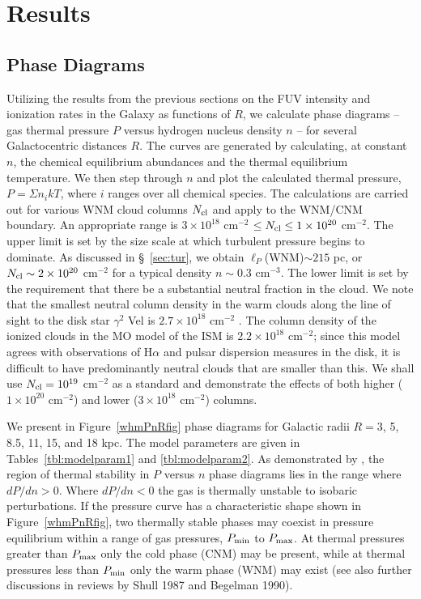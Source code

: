 \documentclass[12pt,preprint,flushrt]{aastex}
\newcommand{\ellp}{\ell_{P}}
\begin{document}
\section{Results}
\label{sec:Results}

\subsection{Phase Diagrams} \label{sub:PnR}

Utilizing the results from the previous sections on the FUV
intensity and ionization rates in the Galaxy as functions of $R$,
we calculate phase diagrams -- gas thermal
pressure
$P$ versus
hydrogen nucleus density $n$ -- for several Galactocentric distances $R$. The
curves are generated by calculating, at constant $n$, the chemical
equilibrium abundances and the thermal equilibrium temperature. We then step
through $n$
and plot the calculated thermal pressure, $P=\Sigma n_i kT$,
where $i$ ranges over all chemical species. The calculations are carried
out for various WNM cloud columns $N_{\rm cl}$ and apply to the WNM/CNM
boundary.
An appropriate range is $3\times 10^{18}$
cm$^{-2}$ $\le N_{\rm cl} \le 1\times 10^{20}$ cm$^{-2}$. The upper
limit is set by the size scale at which turbulent pressure
begins to dominate. As
discussed in \S~\ref{sec:tur}, we obtain $\ellp$(WNM)$\sim 215$ pc,
or $N_{\rm cl}\sim 2\times 10^{20}$ cm$^{-2}$ for a typical
density $n\sim 0.3$ cm$^{-3}$. The lower limit is set by the
requirement that there be a substantial neutral fraction in
the cloud.  We note that the smallest neutral column density
in the warm clouds along the line of sight to the disk star $\gamma^2$ Vel
is $2.7\times 10^{18}$ cm$^{-2}$ \citep{fitz94}.  The column
density of the ionized clouds in the MO model of the ISM
is $2.2\times 10^{18}$ cm$^{-2}$; since this model agrees with
observations of H$\alpha$ and pulsar dispersion measures in the disk,
it is difficult to have predominantly neutral
clouds that are smaller than this.
We shall use $N_{\rm cl}=10^{19}$ cm$^{-2}$
as a standard and demonstrate the effects of both higher
($1\times 10^{20}$ cm$^{-2}$)
and lower ($3\times 10^{18}$ cm$^{-2}$) columns.

We present in Figure~\ref{whmPnRfig} phase diagrams for Galactic radii
$R=3$, 5, 8.5,
11, 15, and 18 kpc. The model parameters are given in 
Tables~\ref{tbl:modelparam1} and \ref{tbl:modelparam2}.
As demonstrated by \cite{field65},
the region of thermal stability in $P$ versus
$n$ phase diagrams lies in the range where $d P/d n >0$.
Where $d P/d n < 0$ the gas is thermally unstable to
isobaric perturbations.
If the pressure curve has a characteristic shape
shown in Figure~\ref{whmPnRfig}, two thermally stable phases may
coexist in pressure equilibrium within a range of gas pressures,
$P_{\rm min}$ to $P_{\rm max}$. At thermal pressures greater
than $P_{\rm max}$
only the cold phase (CNM) may be present, while at thermal
pressures less than
$P_{\rm min}$ only the warm phase (WNM) may exist (see also further
discussions in reviews by Shull 1987 and Begelman 1990).
\end{document}
